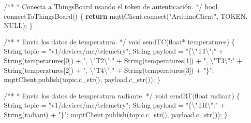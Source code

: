 \documentclass[
  letterpaper,
]{scrbook}
\newenvironment{Shaded}{\begin{snugshade}}{\end{snugshade}}
\newcommand{\BuiltInTok}[1]{\textcolor[rgb]{0.00,0.23,0.31}{#1}}
\newcommand{\CharTok}[1]{\textcolor[rgb]{0.13,0.47,0.30}{#1}}
\newcommand{\ControlFlowTok}[1]{\textcolor[rgb]{0.00,0.23,0.31}{\textbf{#1}}}
\newcommand{\DecValTok}[1]{\textcolor[rgb]{0.68,0.00,0.00}{#1}}
\newcommand{\ExtensionTok}[1]{\textcolor[rgb]{0.00,0.23,0.31}{#1}}
\newcommand{\NormalTok}[1]{\textcolor[rgb]{0.00,0.23,0.31}{#1}}
\newcommand{\OperatorTok}[1]{\textcolor[rgb]{0.37,0.37,0.37}{#1}}
\newcommand{\StringTok}[1]{\textcolor[rgb]{0.13,0.47,0.30}{#1}}
\begin{document}
\begin{Shaded}
\begin{Highlighting}[]
\OperatorTok{/**}
 \OperatorTok{*}\NormalTok{ Conecta a ThingsBoard usando el token de autenticación.}
 \OperatorTok{*/}
\BuiltInTok{bool}\NormalTok{ connectToThingsBoard() \{}
  \ControlFlowTok{return}\NormalTok{ mqttClient.}\ExtensionTok{connect}\NormalTok{(}\StringTok{"ArduinoClient"}\NormalTok{, TOKEN, NULL)}\OperatorTok{;}
\NormalTok{\}}

\OperatorTok{/**}
 \OperatorTok{*}\NormalTok{ Envía los datos de temperatura.}
 \OperatorTok{*/}
\NormalTok{void sendTC(}\BuiltInTok{float}\OperatorTok{*}\NormalTok{ temperatures) \{}
\NormalTok{  String topic }\OperatorTok{=} \StringTok{"v1/devices/me/telemetry"}\OperatorTok{;}
\NormalTok{  String payload }\OperatorTok{=} \StringTok{"\{}\CharTok{\textbackslash{}"}\StringTok{T1}\CharTok{\textbackslash{}"}\StringTok{:"} \OperatorTok{+}\NormalTok{ String(temperatures[}\DecValTok{0}\NormalTok{]) }\OperatorTok{+} 
                   \StringTok{", }\CharTok{\textbackslash{}"}\StringTok{T2}\CharTok{\textbackslash{}"}\StringTok{:"} \OperatorTok{+}\NormalTok{ String(temperatures[}\DecValTok{1}\NormalTok{]) }\OperatorTok{+} 
                   \StringTok{", }\CharTok{\textbackslash{}"}\StringTok{T3}\CharTok{\textbackslash{}"}\StringTok{:"} \OperatorTok{+}\NormalTok{ String(temperatures[}\DecValTok{2}\NormalTok{]) }\OperatorTok{+} 
                   \StringTok{", }\CharTok{\textbackslash{}"}\StringTok{T4}\CharTok{\textbackslash{}"}\StringTok{:"} \OperatorTok{+}\NormalTok{ String(temperatures[}\DecValTok{3}\NormalTok{]) }\OperatorTok{+} \StringTok{"\}"}\OperatorTok{;}
\NormalTok{  mqttClient.publish(topic.c\_str(), payload.c\_str())}\OperatorTok{;}
\NormalTok{\}}

\OperatorTok{/**}
 \OperatorTok{*}\NormalTok{ Envía los datos de temperatura radiante.}
 \OperatorTok{*/}
\NormalTok{void sendRT(}\BuiltInTok{float}\NormalTok{ radiant) \{}
\NormalTok{  String topic }\OperatorTok{=} \StringTok{"v1/devices/me/telemetry"}\OperatorTok{;}
\NormalTok{  String payload }\OperatorTok{=} \StringTok{"\{}\CharTok{\textbackslash{}"}\StringTok{TR}\CharTok{\textbackslash{}"}\StringTok{:"} \OperatorTok{+}\NormalTok{ String(radiant) }\OperatorTok{+} \StringTok{"\}"}\OperatorTok{;}
\NormalTok{  mqttClient.publish(topic.c\_str(), payload.c\_str())}\OperatorTok{;}  
\NormalTok{\}}


\end{Highlighting}
\end{Shaded}
\end{document}
